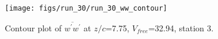 \begin{figure}[H]
\centering
\texttt{[image: figs/run\_30/run\_30\_ww\_contour]}
\caption{Contour plot of $\overline{w^\prime w^\prime}$ at $z/c$=7.75, $V_{free}$=32.94, station 3.}
\label{fig:run_30_ww_contour}
\end{figure}


